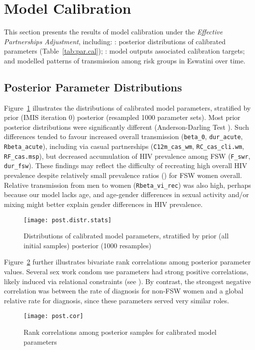 \section{Model Calibration}\label{sr.cal}
This section presents the results of model calibration
under the \emph{Effective Partnerships Adjustment}, including:
: posterior distributions of calibrated parameters (Table~\ref{tab:par.cal});
: model outputs \vs associated calibration targets; and
 modelled patterns of transmission among risk groups in Eswatini over time.
\subsection{Posterior Parameter Distributions}\label{sr.cal.par}
Figure~\ref{fig:post.distr} illustrates the distributions of calibrated model parameters,
stratified by prior (IMIS iteration 0) \vs posterior (resampled 1000 parameter sets).
Most prior \vs posterior distributions were significantly different
(Anderson-Darling Test \cite{Scholz1987}).
Such differences tended to favour increased overall transmission
(\eg \texttt{beta_0}, \texttt{dur_acute}, \texttt{Rbeta_acute}),
including via casual partnerships
(\eg \texttt{C12m_cas_wm}, \texttt{RC_cas_cli.wm}, \texttt{RF_cas.msp}),
but decreased accumulation of HIV prevalence among FSW
(\eg \texttt{F_swr}, \texttt{dur_fsw}).
These findings may reflect the difficulty of recreating high overall HIV prevalence
despite relatively small prevalence ratios () for FSW \vs women overall.
Relative transmission from men to women (\texttt{Rbeta_vi_rec}) was also high,
perhaps because our model lacks age, and
age-gender differences in sexual activity and/or mixing might better explain
gender differences in HIV prevalence.
\begin{figure}
  \centering\texttt{[image: post.distr.stats]}
  \caption{Distributions of calibrated model parameters,
    stratified by prior (all initial samples) \vs posterior (1000 resamples)}
  \label{fig:post.distr}
\end{figure}
\par
Figure~\ref{fig:post.cor} further illustrates
bivariate rank correlations among posterior parameter values.
Several sex work condom use parameters had strong positive correlations,
likely induced via relational constraints (see ).
By contrast, the strongest negative correlation was between
the rate of diagnosis for non-FSW women and a global relative rate for diagnosis,
since these parameters served very similar roles.
\begin{figure}
  \centering\texttt{[image: post.cor]}
  \caption{Rank correlations among posterior samples for calibrated model parameters}
  \label{fig:post.cor}
\end{figure}
